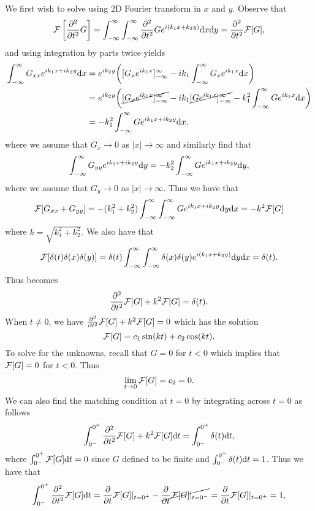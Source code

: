 \documentclass[12pt]{report}
\begin{document}
\begin{solution}
\begin{enumerate}
        We first wish to solve  using 2D Fourier transform in $x$ and $y$. Observe that
        \begin{align*}
            {\mathcal{F}}\left[\frac{\partial^{2} }{\partial t^{2}}G\right] = \int_{-\infty}^{\infty} \int_{-\infty}^{\infty} \frac{\partial^{2} }{\partial t^{2}}Ge^{i(k_1x + k_2y)}{\mathrm{d}} x {\mathrm{d}} y=\frac{\partial^{2} }{\partial t^{2}}{\mathcal{F}}[G],
        \end{align*}
        and using integration by parts twice yields
        \begin{align*}
            \int_{-\infty}^{\infty}G_{xx}e^{ik_1x+ik_2y}{\mathrm{d}} x &= e^{ik_2y}{\left([G_x e^{ik_1x}]_{-\infty}^{\infty} - ik_1 \int_{-\infty}^{\infty} G_x e^{ik_1 x}{\mathrm{d}} x\right)}\\
            &= e^{ik_2y}{\left(\cancel{[G_x e^{ik_1 x}]_{-\infty}^{\infty}} - ik_1 \cancel{[Ge^{ik_1 x}]_{-\infty}^\infty} - k_1^2 \int_{-\infty}^{\infty} G e^{i k_1 x}{\mathrm{d}} x\right)}\\
            &= -k_1^2 \int_{-\infty}^{\infty} Ge^{ik_1x + ik_2y}{\mathrm{d}} x,
        \end{align*}
        where we assume that $G_x \to 0$ as $|x| \to \infty$ and similarly find that
        \[
            \int_{-\infty}^{\infty}G_{yy}e^{ik_1x+ik_2y}{\mathrm{d}} y = -k_2^2 \int_{-\infty}^{\infty} Ge^{ik_1x + ik_2y}{\mathrm{d}} y,
        \]
        where we assume that $G_y \to 0$ as $|x| \to \infty$. Thus we have that
        \[
            {\mathcal{F}}[G_{xx} + G_{yy}] = -(k_1^2 + k_2^2)\int_{-\infty}^{\infty}\int_{-\infty}^{\infty} Ge^{ik_1x + ik_2y}{\mathrm{d}} y{\mathrm{d}} x = -k^2 {\mathcal{F}}[G]  
        \] 
        where $k=\sqrt{k_1^2 + k_2^2}.$ We also have that
        \begin{align*}
            {\mathcal{F}}[\delta(t)\delta(x)\delta(y)] = \delta(t)\int_{-\infty}^{\infty}\int_{-\infty}^{\infty} \delta(x) \delta(y) e^{i(k_1x + k_2y)}{\mathrm{d}} y {\mathrm{d}} x = \delta(t).
        \end{align*}
        Thus  becomes
        \[
            \frac{\partial^{2} }{\partial t^{2}}{\mathcal{F}}[G] + k^2 {\mathcal{F}}[G] = \delta(t).
        \]
        When $t\neq 0$, we have $\frac{\partial^{2} }{\partial t^{2}}{\mathcal{F}}[G] + k^2 {\mathcal{F}}[G] = 0 $ which has the solution
        \[
            {\mathcal{F}}[G] = c_1 \sin(k t) + c_2 \cos(k t).
        \]
        To solve for the unknowns, recall that $G = 0$ for $t<0$ which implies that ${\mathcal{F}}[G] = 0$ for $t<0$. Thus
        \[
            \lim_{t \to 0}{\mathcal{F}}[G] = c_2 = 0.
        \]
        We can also find the matching condition at $t=0$ by integrating across $t=0$ as follows
        \[
            \int_{0^-}^{0^+}\frac{\partial^{2} }{\partial t^{2}}{\mathcal{F}}[G] + k^2 {\mathcal{F}}[G]{\mathrm{d}} t = \int_{0^-}^{0^+}\delta(t){\mathrm{d}} t,
        \]
        where $\int_{0^-}^{0^+}{\mathcal{F}}[G] {\mathrm{d}} t = 0$ since $G$ defined to be finite and $\int_{0^-}^{0^+}\delta(t){\mathrm{d}} t = 1$. Thus we have that
        \[
            \int_{0^-}^{0^+}\frac{\partial^{2} }{\partial t^{2}}{\mathcal{F}}[G]{\mathrm{d}} t = \frac{\partial }{\partial t}{\mathcal{F}}[G]|_{t=0^+}-\cancel{\frac{\partial }{\partial t}{\mathcal{F}}[G]|_{t=0^-}} = \frac{\partial }{\partial t}{\mathcal{F}}[G]|_{t=0^+} = 1,
\]
\end{enumerate}
\end{solution}
\end{document}

